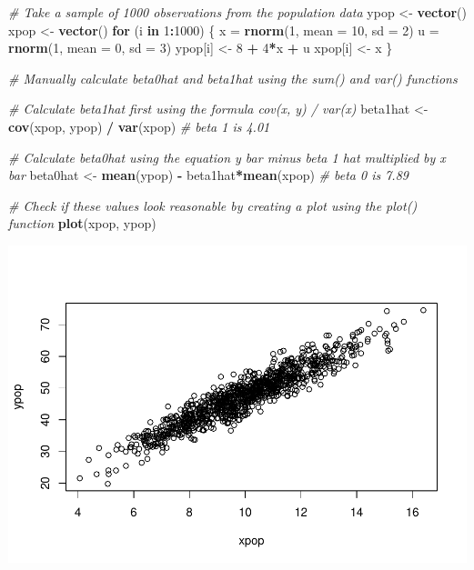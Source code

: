 \documentclass[]{article}
\newenvironment{Shaded}{\begin{snugshade}}{\end{snugshade}}
\newcommand{\KeywordTok}[1]{\textcolor[rgb]{0.13,0.29,0.53}{\textbf{#1}}}
\newcommand{\DataTypeTok}[1]{\textcolor[rgb]{0.13,0.29,0.53}{#1}}
\newcommand{\DecValTok}[1]{\textcolor[rgb]{0.00,0.00,0.81}{#1}}
\newcommand{\StringTok}[1]{\textcolor[rgb]{0.31,0.60,0.02}{#1}}
\newcommand{\CommentTok}[1]{\textcolor[rgb]{0.56,0.35,0.01}{\textit{#1}}}
\newcommand{\ControlFlowTok}[1]{\textcolor[rgb]{0.13,0.29,0.53}{\textbf{#1}}}
\newcommand{\OperatorTok}[1]{\textcolor[rgb]{0.81,0.36,0.00}{\textbf{#1}}}
\newcommand{\NormalTok}[1]{#1}
\begin{document}
\begin{Shaded}
\begin{Highlighting}[]
\CommentTok{# Take a sample of 1000 observations from the population data}
\NormalTok{ypop <-}\StringTok{ }\KeywordTok{vector}\NormalTok{()}
\NormalTok{xpop <-}\StringTok{ }\KeywordTok{vector}\NormalTok{()}
\ControlFlowTok{for}\NormalTok{ (i }\ControlFlowTok{in} \DecValTok{1}\OperatorTok{:}\DecValTok{1000}\NormalTok{) \{}
\NormalTok{  x =}\StringTok{ }\KeywordTok{rnorm}\NormalTok{(}\DecValTok{1}\NormalTok{, }\DataTypeTok{mean =} \DecValTok{10}\NormalTok{, }\DataTypeTok{sd =} \DecValTok{2}\NormalTok{)}
\NormalTok{  u =}\StringTok{ }\KeywordTok{rnorm}\NormalTok{(}\DecValTok{1}\NormalTok{, }\DataTypeTok{mean =} \DecValTok{0}\NormalTok{, }\DataTypeTok{sd =} \DecValTok{3}\NormalTok{)}
\NormalTok{  ypop[i] <-}\StringTok{ }\DecValTok{8} \OperatorTok{+}\StringTok{ }\DecValTok{4}\OperatorTok{*}\NormalTok{x }\OperatorTok{+}\StringTok{ }\NormalTok{u }
\NormalTok{  xpop[i] <-}\StringTok{ }\NormalTok{x}
\NormalTok{\}}

\CommentTok{# Manually calculate beta0hat and beta1hat using the sum() and var() functions }

\CommentTok{# Calculate beta1hat first using the formula cov(x, y) / var(x)}
\NormalTok{beta1hat <-}\StringTok{ }\KeywordTok{cov}\NormalTok{(xpop, ypop) }\OperatorTok{/}\StringTok{ }\KeywordTok{var}\NormalTok{(xpop)}
\CommentTok{# beta 1 is 4.01}

\CommentTok{# Calculate beta0hat using the equation y bar minus beta 1 hat multiplied by x bar }
\NormalTok{beta0hat <-}\StringTok{ }\KeywordTok{mean}\NormalTok{(ypop) }\OperatorTok{-}\StringTok{ }\NormalTok{beta1hat}\OperatorTok{*}\KeywordTok{mean}\NormalTok{(xpop)}
\CommentTok{# beta 0 is 7.89}

\CommentTok{# Check if these values look reasonable by creating a plot using the plot() function}
\KeywordTok{plot}\NormalTok{(xpop, ypop)}
\end{Highlighting}
\end{Shaded}

\includegraphics{macroNoGiodP_files/figure-latex/unnamed-chunk-5-1.pdf}
\end{document}
